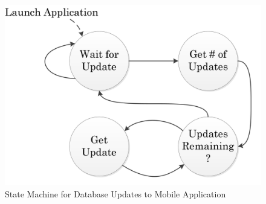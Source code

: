 \documentclass[11pt]{article} %
\begin{document}
\begin{figure}[h!]
\vspace{0.5cm}
\begin{center}
\includegraphics[scale=0.8]{../Graphics/StateMachine}
\caption{State Machine for Database Updates to Mobile Application}
\label{fig:state}
\end{center}
\end{figure}
\newline \quad \newline
\end{document}
